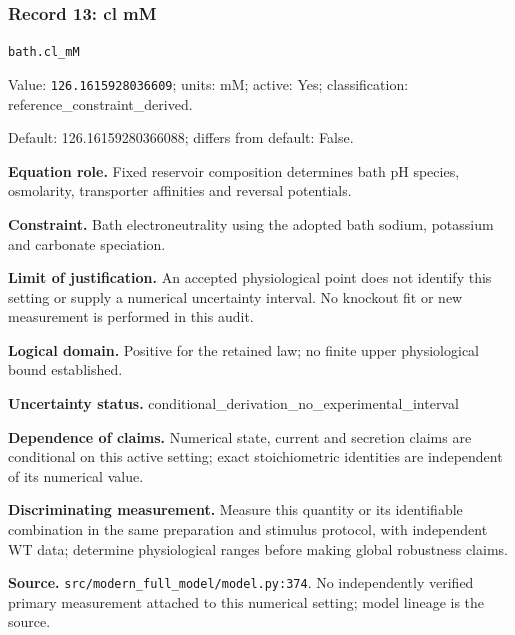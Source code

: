 \subsubsection*{Record 13: cl mM}
{\small \nolinkurl{bath.cl_mM}\par

Value: \texttt{126.1615928036609}; units: mM; active: Yes; classification: reference\_constraint\_derived.\par

Default: 126.16159280366088; differs from default: False.\par

\textbf{Equation role.} Fixed reservoir composition determines bath pH species, osmolarity, transporter affinities and reversal potentials.\par

\textbf{Constraint.} Bath electroneutrality using the adopted bath sodium, potassium and carbonate speciation.\par

\textbf{Limit of justification.} An accepted physiological point does not identify this setting or supply a numerical uncertainty interval. No knockout fit or new measurement is performed in this audit.\par

\textbf{Logical domain.} Positive for the retained law; no finite upper physiological bound established.\par

\textbf{Uncertainty status.} conditional\_derivation\_no\_experimental\_interval\par

\textbf{Dependence of claims.} Numerical state, current and secretion claims are conditional on this active setting; exact stoichiometric identities are independent of its numerical value.\par

\textbf{Discriminating measurement.} Measure this quantity or its identifiable combination in the same preparation and stimulus protocol, with independent WT data; determine physiological ranges before making global robustness claims.\par

\textbf{Source.} \nolinkurl{src/modern_full_model/model.py:374}. No independently verified primary measurement attached to this numerical setting; model lineage is the source.\par}

